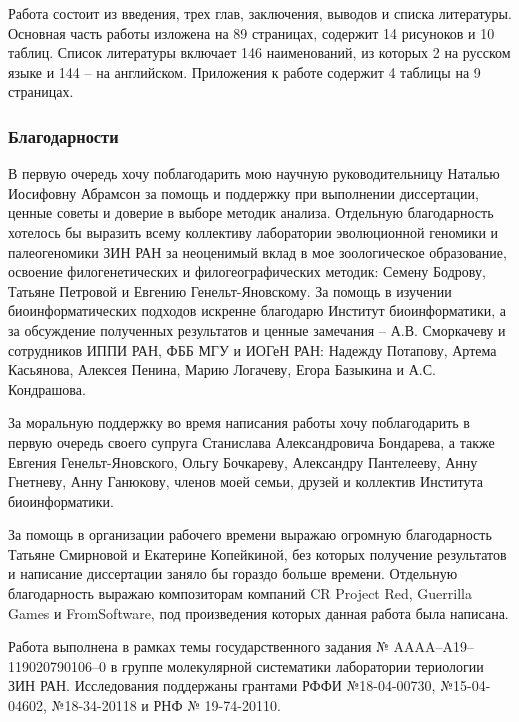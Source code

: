Работа состоит из введения, трех глав, заключения, выводов и списка литературы. Основная часть работы изложена на 89 страницах, содержит 14 рисуноков и 10 таблиц. Список литературы включает 146 наименований, из которых 2 на русском языке и 144 -- на английском. Приложения к работе содержит 4 таблицы на 9 страницах.

\subsubsection*{Благодарности}

В первую очередь хочу поблагодарить мою научную руководительницу Наталью Иосифовну Абрамсон за помощь и поддержку при выполнении диссертации, ценные советы и доверие в выборе методик анализа. Отдельную благодарность хотелось бы выразить всему коллективу лаборатории эволюционной геномики и палеогеномики ЗИН РАН за неоценимый вклад в мое зоологическое образование, освоение филогенетических и филогеографических методик: Семену Бодрову, Татьяне Петровой и Евгению Генельт-Яновскому. За помощь в изучении биоинформатических подходов искренне благодарю Институт биоинформатики, а за обсуждение полученных результатов и ценные замечания -- А.В. Сморкачеву и сотрудников ИППИ РАН, ФББ МГУ и ИОГеН РАН: Надежду Потапову, Артема Касьянова, Алексея Пенина, Марию Логачеву, Егора Базыкина и А.С. Кондрашова.   

За моральную поддержку во время написания работы хочу поблагодарить в первую очередь своего супруга Станислава Александровича Бондарева, а также Евгения Генельт-Яновского, Ольгу Бочкареву, Александру Пантелееву, Анну Гнетневу, Анну Ганюкову, членов моей семьи, друзей и коллектив Института биоинформатики.

За помощь в организации рабочего времени выражаю огромную благодарность Татьяне Смирновой и Екатерине Копейкиной, без которых получение результатов и написание диссертации заняло бы гораздо больше времени. Отдельную благодарность выражаю композиторам компаний CR Project Red, Guerrilla Games и FromSoftware, под произведения которых данная работа была написана. 

Работа выполнена в рамках темы государственного задания № AAAA–A19–119020790106–0 в группе молекулярной систематики лаборатории териологии ЗИН РАН. Исследования поддержаны грантами РФФИ №18-04-00730, №15-04-04602, №18-34-20118 и РНФ № 19-74-20110.

\newpage